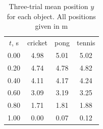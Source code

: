 \begin{table}
  \caption{Three-trial mean position $y$ for each object. All positions given in \unit{\meter}}
  \label{tab:1}
  \begin{ruledtabular}
    \begin{tabular}{cccc}
      $t$, \unit{\second} & cricket & pong & tennis \\
      \colrule
      \num{0.00} & \num{4.98} & \num{5.01} & \num{5.02} \\
      \num{0.20} & \num{4.74} & \num{4.78} & \num{4.82} \\
      \num{0.40} & \num{4.11} & \num{4.17} & \num{4.24} \\
      \num{0.60} & \num{3.09} & \num{3.19} & \num{3.25} \\
      \num{0.80} & \num{1.71} & \num{1.81} & \num{1.88} \\
      \num{1.00} & \num{0.00} & \num{0.07} & \num{0.12} \\
    \end{tabular}
  \end{ruledtabular}
\end{table}
